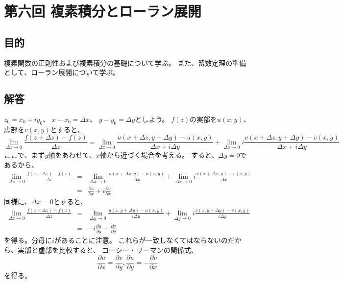 \section{第六回 複素積分とローラン展開}

\subsection{目的}

複素関数の正則性および複素積分の基礎について学ぶ。
また、留数定理の準備として、ローラン展開について学ぶ。

\subsection{解答}


$z_0 = x_0 + i y_0$、
$x - x_0 = \Delta x$、
$y - y_0 = \Delta y$としよう。
$f(z)$の実部を$u(x,y)$、虚部を$v(x,y)$とすると、
$$
  \lim_{\Delta z \rightarrow 0} \frac{f(z+\Delta z) - f(z)}{\Delta z}
  =
  \lim_{\Delta z \rightarrow 0} \frac{u(x+\Delta z,y+\Delta y) - u(x,y)}{\Delta x + i \Delta y}
  + \lim_{\Delta z \rightarrow 0} i \frac{v(x+\Delta z,y+\Delta y) - v(x,y)}{\Delta x + i \Delta y}
$$
ここで、まず$y$軸をあわせて、$x$軸から近づく場合を考える。
すると、$\Delta y = 0$であるから、
\begin{eqnarray}
  \lim_{\Delta z \rightarrow 0} \frac{f(z+\Delta z) - f(z)}{\Delta z}
  &=&
  \lim_{\Delta x \rightarrow 0} \frac{u(x+\Delta x,y) - u(x,y)}{\Delta x}
  + \lim_{\Delta x \rightarrow 0} i \frac{v(x+\Delta x,y) - v(x,y)}{\Delta x}\\
  &=&
  \frac{\partial u}{\partial x} + i \frac{\partial v}{\partial x}
\end{eqnarray}
同様に、$\Delta x = 0$とすると、
\begin{eqnarray}
  \lim_{\Delta z \rightarrow 0} \frac{f(z+\Delta z) - f(z)}{\Delta z}
  &=&
  \lim_{\Delta y \rightarrow 0} \frac{u(x,y+\Delta y) - u(x,y)}{i\Delta y}
  + \lim_{\Delta y \rightarrow 0} i \frac{v(x,y+\Delta y) - v(x,y)}{i\Delta y}\\
  &=&
  -i \frac{\partial u}{\partial y} + \frac{\partial v}{\partial y}
\end{eqnarray}
を得る。分母に$i$があることに注意。
これらが一致しなくてはならないのだから、実部と虚部を比較すると、
コーシー・リーマンの関係式、
$$
  \frac{\partial u}{\partial x} = \frac{\partial v}{\partial y},
  \frac{\partial u}{\partial y} = -\frac{\partial v}{\partial x}
$$
を得る。

